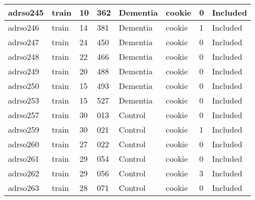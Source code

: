 \begin{center}
\begin{longtable}{|l|l|l|l|l|l|l|l|}
adrso245       & train                 & 10              & 362                & Dementia             & cookie          & 0                & Included      \\ \hline
adrso246       & train                 & 14              & 381                & Dementia             & cookie          & 1                & Included      \\ \hline
adrso247       & train                 & 24              & 450                & Dementia             & cookie          & 0                & Included      \\ \hline
adrso248       & train                 & 22              & 466                & Dementia             & cookie          & 0                & Included      \\ \hline
adrso249       & train                 & 20              & 488                & Dementia             & cookie          & 0                & Included      \\ \hline
adrso250       & train                 & 15              & 493                & Dementia             & cookie          & 0                & Included      \\ \hline
adrso253       & train                 & 15              & 527                & Dementia             & cookie          & 0                & Included      \\ \hline
adrso257       & train                 & 30              & 013                & Control              & cookie          & 0                & Included      \\ \hline
adrso259       & train                 & 30              & 021                & Control              & cookie          & 1                & Included      \\ \hline
adrso260       & train                 & 27              & 022                & Control              & cookie          & 0                & Included      \\ \hline
adrso261       & train                 & 29              & 054                & Control              & cookie          & 0                & Included      \\ \hline
adrso262       & train                 & 29              & 056                & Control              & cookie          & 3                & Included      \\ \hline
adrso263       & train                 & 28              & 071                & Control              & cookie          & 0                & Included      \\ \hline

\end{longtable}
\end{center}
